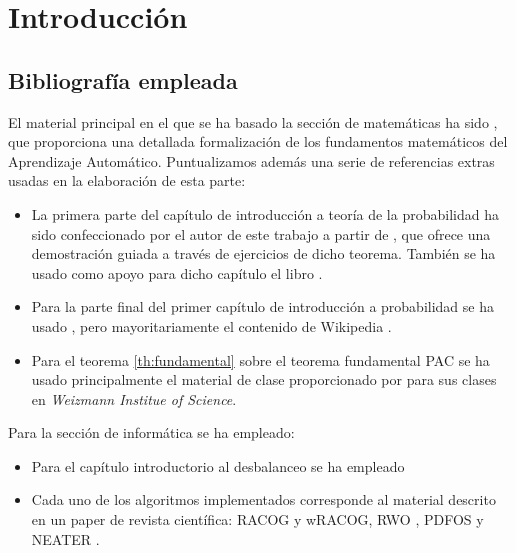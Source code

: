 \chapter*{Introducción}

  \section*{Bibliografía empleada}
  El material principal en el que se ha basado la sección de matemáticas ha sido \citeauthor{shalev}, 
  que proporciona una detallada formalización de los fundamentos matemáticos del Aprendizaje Automático. Puntualizamos además
  una serie de referencias extras usadas en la elaboración de esta parte:
  
  \begin{itemize} 
   \item La primera parte del capítulo de introducción a teoría de la probabilidad ha sido confeccionado por el autor de 
   este trabajo a partir de \citet{caratheodory}, que ofrece una demostración guiada a través de ejercicios de dicho teorema. 
   También se ha usado como apoyo para dicho capítulo el libro \citeauthor{loeve}. 
   \item Para la parte final del primer capítulo de introducción a probabilidad se ha usado \citeauthor{shalev}, pero
   mayoritariamente el contenido de Wikipedia \citep{wiki:markov, wiki:hoeff_lemma, wiki:hoeffding}.
   \item Para el teorema \ref{th:fundamental} sobre el teorema fundamental PAC se ha usado principalmente el material de clase
   proporcionado por \citeauthor{slfetaya} para sus clases en \textit{Weizmann Institue of Science}.
  \end{itemize}
   
   Para la sección de informática se ha empleado:
   
  \begin{itemize}
   \item Para el capítulo introductorio al desbalanceo se ha empleado \citep{he2009} 
   \item Cada uno de los algoritmos implementados corresponde al material descrito en un paper de revista científica: 
   RACOG y wRACOG\citep{das2015}, RWO \citep{zhang2014}, PDFOS \citep{gao2014} y NEATER \citep{almogahed2014}.
  \end{itemize}

   